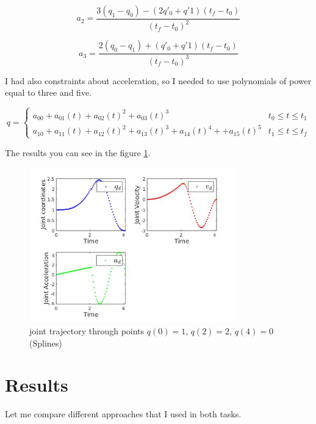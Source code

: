 \documentclass[12pt, a4paper]{report}
\begin{document}
\begin{equation}
	a_2 = \frac{3(q_1-q_0)-(2q'_0+q'1)(t_f-t_0)}{(t_f-t_0)^2}
\end{equation}


\begin{equation}
	a_3 = \frac{2(q_0-q_1)+(q'_0+q'1)(t_f-t_0)}{(t_f-t_0)^3}
\end{equation}

I had also constraints about acceleration, so I needed to use polynomials of power equal to three and five.

\begin{equation}
	q = \begin{cases}
	a_{00} + a_{01}(t) + a_{02}(t)^2 +a_{03}(t)^3 & t_0 \leq t \leq t_1 \\
	a_{10} + a_{11}(t) + a_{12}(t)^2 +a_{13}(t)^3+a_{14}(t)^4++a_{15}(t)^5  & t_1 \leqslant t \leq t_f
	\end{cases}
\end{equation}

The results you can see in the figure \ref{fig:mesh7}.

\begin{figure}[H]
	\centering
		\includegraphics[width=0.8\textwidth]{23} %
	\caption{joint trajectory through points $q(0) = 1$, $q(2) = 2$, $q(4) = 0$ (Splines)} %
	\label{fig:mesh7}
\end{figure}

\section*{Results} \label{sec:Results}
%

Let me compare different approaches that I used in both tasks.
\end{document}
